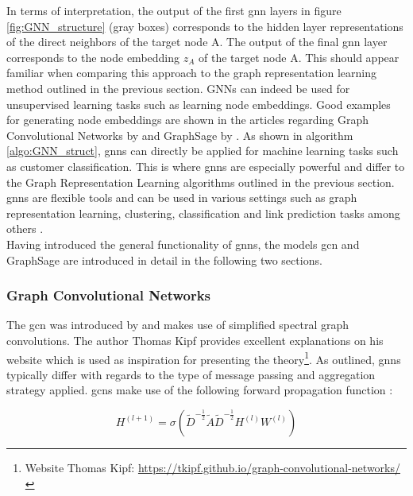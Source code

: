 	\noindent In terms of interpretation, the output of the first \acs{gnn} layers in
	figure \ref{fig:GNN_structure} (gray boxes) corresponds to the hidden layer 
	representations of the direct neighbors of the target node A. The output of 
	the final \acs{gnn} layer corresponds to the node embedding $z_{A}$ of the target 
	node A. This should appear familiar when comparing this approach to the graph 
	representation learning method outlined in the previous section. 
	GNNs can indeed be used for unsupervised learning tasks such as learning 
	node embeddings. Good examples for generating node embeddings are shown in 
	the articles regarding Graph Convolutional Networks by \cite{kipf2016semi} 
	and GraphSage by \cite{hamilton2017inductive}. As shown in algorithm 
	\ref{algo:GNN_struct}, \acs{gnn}s can directly be applied for machine learning
	tasks such as customer classification. This is where \acs{gnn}s are especially 
	powerful and differ to the Graph Representation Learning algorithms 
	outlined in the previous section. \acs{gnn}s are flexible tools and can be used 
	in various settings such as graph representation learning, clustering, 
	classification and link prediction tasks among others \citep{zhou2020graph}. \\

	\noindent Having introduced the general functionality of \acs{gnn}s, the models
	\ac{gcn} and GraphSage are introduced in detail in the following two sections. 

	\subsubsection{Graph Convolutional Networks}
	
	\noindent The \acl{gcn} was introduced by \cite{kipf2016semi} and makes use 
	of simplified spectral graph convolutions. The author Thomas Kipf 
	\citeyearpar{kipf2016online} provides excellent explanations on his website 
	which is used as inspiration for presenting the theory\footnote{Website Thomas Kipf: 
	\url{https://tkipf.github.io/graph-convolutional-networks/}}. As outlined, 
	\acs{gnn}s typically differ with regards to the type of message passing and 
	aggregation strategy applied. \acs{gcn}s make use of the following forward 
	propagation function \citep[p. 2]{kipf2016semi}:

	\begin{equation}
		H^{(l+1)} = \sigma\left(\tilde D^{-\frac{1}{2}}\tilde A \tilde
		D^{-\frac{1}{2}}H^{(l)}W^{(l)}\right)
		\label{eq:GCN}
	\end{equation}
	

